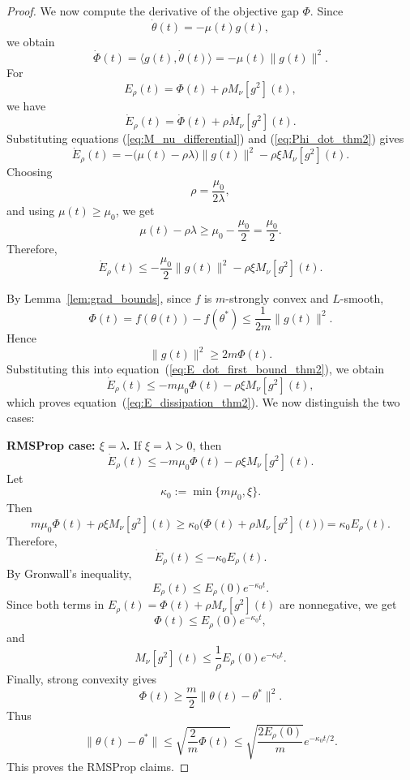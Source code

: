 \documentclass{article} %
\begin{document}
\begin{proof}
We now compute the derivative of the objective gap $\Phi$. Since
\[
\dot\theta(t)
=
-
\mu(t)g(t),
\]
we obtain
\begin{equation}
\label{eq:Phi_dot_thm2}
\dot\Phi(t)
=
\langle g(t),\dot\theta(t)\rangle
=
-\mu(t)\|g(t)\|^2.
\end{equation}
For
\[
E_\rho(t)
=
\Phi(t)+\rho M_\nu[g^2](t),
\]
we have
\[
\dot E_\rho(t)
=
\dot\Phi(t)+\rho \dot M_\nu[g^2](t).
\]
Substituting equations (\ref{eq:M_nu_differential}) and (\ref{eq:Phi_dot_thm2}) gives
\begin{equation}
\label{eq:E_dot_raw_thm2}
\dot E_\rho(t)
=
-
\bigl(\mu(t)-\rho\lambda\bigr)\|g(t)\|^2
-
\rho\xi M_\nu[g^2](t).
\end{equation}
Choosing
\[
\rho
=
\frac{\mu_0}{2\lambda},
\]
and using \(\mu(t)\ge \mu_0\), we get
\[
\mu(t)-\rho\lambda
\ge
\mu_0-\frac{\mu_0}{2}
=
\frac{\mu_0}{2}.
\]
Therefore,
\begin{equation}
\label{eq:E_dot_first_bound_thm2}
\dot E_\rho(t)
\le
-
\frac{\mu_0}{2}\|g(t)\|^2
-
\rho\xi M_\nu[g^2](t).
\end{equation}

By Lemma~\ref{lem:grad_bounds}, since \(f\) is \(m\)-strongly convex and \(L\)-smooth,
\[
\Phi(t)
=
f(\theta(t))-f(\theta^*)
\le
\frac{1}{2m}\|g(t)\|^2.
\]
Hence
\[
\|g(t)\|^2
\ge
2m\Phi(t).
\]
Substituting this into equation~(\ref{eq:E_dot_first_bound_thm2}), we obtain
\[
\dot E_\rho(t)
\le
-
m\mu_0\Phi(t)
-
\rho\xi M_\nu[g^2](t),
\]
which proves equation~(\ref{eq:E_dissipation_thm2}). We now distinguish the two cases:

\medskip

\noindent\textbf{RMSProp case: \(\xi=\lambda\).}
If \(\xi=\lambda>0\), then
\[
\dot E_\rho(t)
\le
-
m\mu_0\Phi(t)
-
\rho\xi M_\nu[g^2](t).
\]
Let
\[
\kappa_0
:=
\min\{m\mu_0,\xi\}.
\]
Then
\[
m\mu_0\Phi(t)
+
\rho\xi M_\nu[g^2](t)
\ge
\kappa_0
\bigl(
\Phi(t)+\rho M_\nu[g^2](t)
\bigr)
=
\kappa_0 E_\rho(t).
\]
Therefore,
\[
\dot E_\rho(t)
\le
-\kappa_0 E_\rho(t).
\]
By Gronwall's inequality,
\[
E_\rho(t)
\le
E_\rho(0)e^{-\kappa_0 t}.
\]
Since both terms in \(E_\rho(t)=\Phi(t)+\rho M_\nu[g^2](t)\) are nonnegative, we get
\[
\Phi(t)
\le
E_\rho(0)e^{-\kappa_0 t},
\]
and
\[
M_\nu[g^2](t)
\le
\frac{1}{\rho}E_\rho(0)e^{-\kappa_0 t}.
\]
Finally, strong convexity gives
\[
\Phi(t)
\ge
\frac m2\|\theta(t)-\theta^*\|^2.
\]
Thus
\[
\|\theta(t)-\theta^*\|
\le
\sqrt{\frac{2}{m}\Phi(t)}
\le
\sqrt{\frac{2E_\rho(0)}{m}}e^{-\kappa_0 t/2}.
\]
This proves the RMSProp claims.

\medskip


\end{proof}
\end{document}
